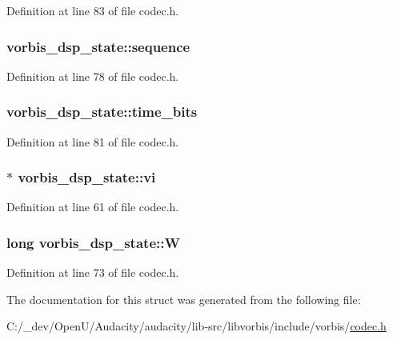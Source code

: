 Definition at line 83 of file codec.\+h.

\subsubsection[{\texorpdfstring{sequence}{sequence}}]{ vorbis\+\_\+dsp\+\_\+state\+::sequence}\hypertarget{structvorbis__dsp__state_a38a8b96daf9d16d8cce0522e203635a6}{}\label{structvorbis__dsp__state_a38a8b96daf9d16d8cce0522e203635a6}


Definition at line 78 of file codec.\+h.

\subsubsection[{\texorpdfstring{time\+\_\+bits}{time_bits}}]{ vorbis\+\_\+dsp\+\_\+state\+::time\+\_\+bits}\hypertarget{structvorbis__dsp__state_adef49c2187f4ed3381973274e1b01151}{}\label{structvorbis__dsp__state_adef49c2187f4ed3381973274e1b01151}


Definition at line 81 of file codec.\+h.

\subsubsection[{\texorpdfstring{vi}{vi}}]{$\ast$ vorbis\+\_\+dsp\+\_\+state\+::vi}\hypertarget{structvorbis__dsp__state_ab6819a31e79031cdcd8f2ff40a5c1def}{}\label{structvorbis__dsp__state_ab6819a31e79031cdcd8f2ff40a5c1def}


Definition at line 61 of file codec.\+h.

\subsubsection[{\texorpdfstring{W}{W}}]{\setlength{\rightskip}{0pt plus 5cm}long vorbis\+\_\+dsp\+\_\+state\+::W}\hypertarget{structvorbis__dsp__state_a1cc3a520dcf831fb967341e5095c7b38}{}\label{structvorbis__dsp__state_a1cc3a520dcf831fb967341e5095c7b38}


Definition at line 73 of file codec.\+h.



The documentation for this struct was generated from the following file\+:\begin{DoxyCompactItemize}
\item 
C\+:/\+\_\+dev/\+Open\+U/\+Audacity/audacity/lib-\/src/libvorbis/include/vorbis/\hyperlink{codec_8h}{codec.\+h}\end{DoxyCompactItemize}
